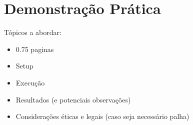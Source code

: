 \section{Demonstração Prática}
Tópicos a abordar:
\begin{itemize}
    \item 0.75 paginas
    \item Setup
    \item Execução
    \item Resultados (e potenciais observações)
    \item Considerações éticas e legais (caso seja necessário palha)
\end{itemize}